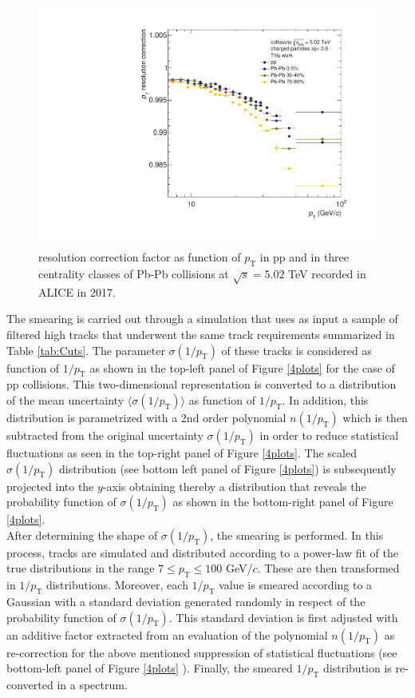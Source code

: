 \documentclass[12pt,a4paper]{report}
\begin{document}
\begin{figure}[tb!]
\centering
\includegraphics[width=12cm]{Plots/ptrescorrppPbPb.pdf}  
\caption{\pt resolution correction factor as function of $p_{\mathrm{T}}$ in pp and in three centrality classes of Pb-Pb collisions at $\sqrt{s} = 5.02$ TeV recorded in ALICE in 2017.}
\label{ptrescorrppPbPb}
\end{figure}
The smearing is carried out through a simulation that uses as input a sample of filtered high \pt tracks that underwent the same track requirements summarized in Table \ref{tab:Cuts}. The parameter $\sigma(1/p_\text{T})$ of these tracks is considered as function of $1/p_\text{T}$ as shown in the top-left panel of Figure \ref{4plots} for the case of pp collisions. This two-dimensional representation is converted to a distribution of the mean uncertainty $\langle\sigma(1/p_\text{T})\rangle$ as function of $1/p_\text{T}$. In addition, this distribution is parametrized with a 2nd order polynomial $n(1/p_\text{T})$ which is then subtracted from the original uncertainty $\sigma(1/p_\text{T})$ in order to reduce statistical fluctuations as seen in the top-right panel of Figure \ref{4plots}. The scaled $\sigma(1/p_\text{T})$ distribution (see bottom left panel of Figure \ref{4plots}) is subsequently projected into the $y$-axis obtaining thereby a distribution that reveals the probability function of $\sigma(1/p_\text{T})$ as shown in the bottom-right panel of Figure \ref{4plots}.\\
After determining the shape of $\sigma(1/p_\text{T})$, the smearing is performed. In this process, tracks are simulated and distributed according to a power-law fit of the true \pt distributions in the range $7 \leq p_\text{T} \leq 100$ GeV/$c$. These are then transformed in $1/p_\text{T}$ distributions. Moreover, each $1/p_\text{T}$ value is smeared according to a Gaussian with a standard deviation generated randomly in respect of the probability function of $\sigma(1/p_\text{T})$. This standard deviation is first adjusted with an additive factor extracted from an evaluation of the polynomial $n(1/p_\text{T})$ as re-correction for the above mentioned suppression of statistical fluctuations (see bottom-left panel of Figure \ref{4plots} ). Finally, the smeared $1/p_\text{T}$ distribution is re-converted in a \pt spectrum.\\
\end{document}
